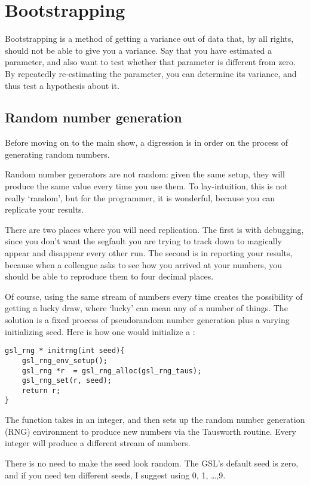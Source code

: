 \chapter{Bootstrapping} \label{boot}

Bootstrapping is a method of getting a variance out of data that, by all
rights, should not be able to give you a variance. Say that you have
estimated a parameter, and also want to test whether that parameter is
different from zero. By repeatedly re-estimating the parameter, you can
determine its variance, and thus test a hypothesis about it.

\section{Random number generation}\label{randomnumbers}
Before moving on to the main show, a digression is in order on the
process of generating random numbers. 

Random number generators are not random: given the same setup, they
will produce the same value every time you use them. To lay-intuition,
this is not really `random', but for the programmer, it is wonderful,
because you can replicate your results.

There are two places where you will need replication. The first is with
debugging, since you don't want the segfault you are trying to track
down to magically appear and disappear every other run. The second is
in reporting your results, because when a colleague asks to see how you
arrived at your numbers, you should be able to reproduce them to four
decimal places.

Of course, using the same stream of numbers every time creates the
possibility of getting a lucky draw, where `lucky' can mean any of a
number of things. The solution is a fixed process of pseudorandom
number generation plus a varying initializing seed. Here is how one
would initialize a :
\begin{lstlisting}
gsl_rng * initrng(int seed){
    gsl_rng_env_setup();
    gsl_rng *r  = gsl_rng_alloc(gsl_rng_taus);
    gsl_rng_set(r, seed);  
    return r;
}
\end{lstlisting}
The function takes in an integer, and then sets up the random number
generation (RNG) environment to produce new numbers via the Tausworth
routine. Every integer will produce a different stream of numbers.

There is no need to make the seed look random. The GSL's default seed is
zero, and if you need ten different seeds, I suggest using 0, 1, \dots ,9.

